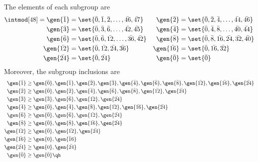 \begin{sol}
    The elements of each subgroup are
    \begin{align*}
        \intmod[48] = \gen{\bar 1} & = \set{\bar 0, \bar 1, \bar 2, \ldots, \bar{46}, \bar{47}} & \gen{\bar 2} & = \set{\bar 0, \bar 2, \bar 4, \ldots, \bar{44}, \bar{46}} \\
        \gen{\bar 3} & = \set{\bar 0, \bar 3, \bar 6, \ldots, \bar{42}, \bar{45}} & \gen{\bar 4} & = \set{\bar 0, \bar 4, \bar 8, \ldots, \bar{40}, \bar{44}} \\
        \gen{\bar 6} & = \set{\bar 0, \bar 6, \bar{12}, \ldots, \bar{36}, \bar{42}} & \gen{\bar 8} & = \set{\bar 0, \bar 8, \bar{16}, \bar{24}, \bar{32}, \bar{40}} \\
        \gen{\bar{12}} & = \set{\bar 0, \bar{12}, \bar{24}, \bar{36}} & \gen{\bar{16}} & = \set{\bar 0, \bar{16}, \bar{32}} \\
        \gen{\bar{24}} & = \set{\bar 0, \bar{24}} & \gen{\bar 0} & = \set{\bar 0}
    \end{align*}
    Moreover, the subgroup inclusions are
    \begin{align*}
        \gen{\bar 1} & \geq \gen{\bar 0}, \gen{\bar 1}, \gen{\bar 2}, \gen{\bar 3}, \gen{\bar 4}, \gen{\bar 6}, \gen{\bar 8}, \gen{\bar{12}}, \gen{\bar{16}}, \gen{\bar{24}} \\
        \gen{\bar 2} & \geq \gen{\bar 0}, \gen{\bar 2}, \gen{\bar 4}, \gen{\bar 6}, \gen{\bar 8}, \gen{\bar{12}}, \gen{\bar{24}} \\
        \gen{\bar 3} & \geq \gen{\bar 3}, \gen{\bar 6}, \gen{\bar{12}}, \gen{\bar{24}} \\
        \gen{\bar 4} & \geq \gen{\bar 0}, \gen{\bar 4}, \gen{\bar 8}, \gen{\bar{12}}, \gen{\bar{16}}, \gen{\bar{24}} \\
        \gen{\bar 6} & \geq \gen{\bar 0}, \gen{\bar 6}, \gen{\bar{12}}, \gen{\bar{24}} \\
        \gen{\bar 8} & \geq \gen{\bar 0}, \gen{\bar 8}, \gen{\bar{16}}, \gen{\bar{24}} \\
        \gen{\bar{12}} & \geq \gen{\bar 0}, \gen{\bar{12}}, \gen{\bar{24}} \\
        \gen{\bar{16}} & \geq \gen{0}, \gen{\bar 16} \\
        \gen{\bar{24}} & \geq \gen{0}, \gen{\bar{24}} \\
        \gen{\bar 0} & \geq \gen{\bar 0} \qh
    \end{align*}
\end{sol}

